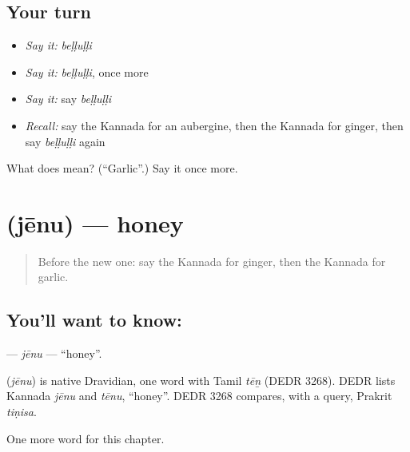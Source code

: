 \subsection*{Your turn}
\begin{itemize}
\raggedright
  \item \emph{Say it:} \emph{beḷḷuḷḷi}
  \item \emph{Say it:} \emph{beḷḷuḷḷi}, once more
  \item \emph{Say it:} say \emph{beḷḷuḷḷi}
  \item \emph{Recall:} say the Kannada for an aubergine, then the Kannada for ginger, then say \emph{beḷḷuḷḷi} again
\end{itemize}

\begin{tcolorbox}[breakable,colback=teal!4,colframe=teal!35!black,title={Before you move on}]
What does  mean? (\textquotedblleft{}Garlic\textquotedblright{}.) Say it once more.
\end{tcolorbox}
\section[\texorpdfstring{\kn{ಜೇನು} (jēnu)}{ಜೇನು (jēnu)}]{ (jēnu) — honey}

\label{lesson:KA-C124-jenu}



\begin{quote}
Before the new one: say the Kannada for ginger, then the Kannada for garlic.
\end{quote}

\subsection*{You'll want to know: }
\textbf{} — \emph{jēnu} — \textquotedblleft{}honey\textquotedblright{}.

\begin{cousinweb}
\textbf{} (\emph{jēnu}) is native Dravidian, one word with Tamil \emph{tēṉ} (DEDR 3268). DEDR lists Kannada \emph{jēnu} and \emph{tēnu}, \textquotedblleft{}honey\textquotedblright{}. DEDR 3268 compares, with a query, Prakrit \emph{tiṇisa}.
\end{cousinweb}

\begin{grammarlens}[title={What you've built}]
One more word for this chapter.
\end{grammarlens}

